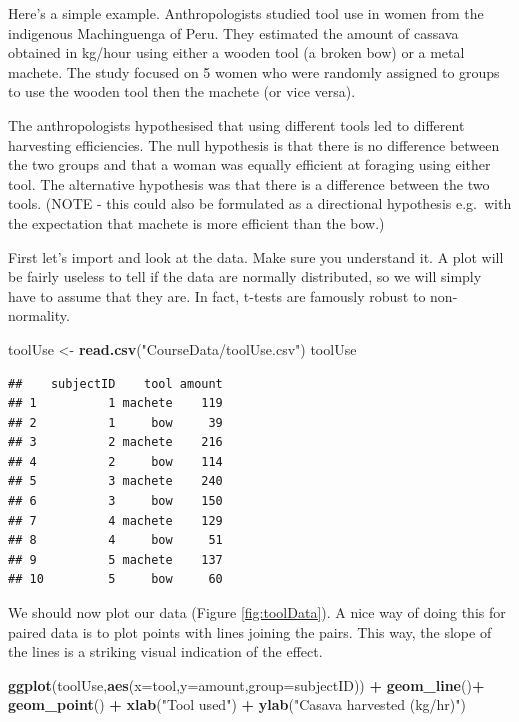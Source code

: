 \documentclass[
  a4paperpaper,
]{book}
\newenvironment{Shaded}{\begin{snugshade}}{\end{snugshade}}
\newcommand{\DataTypeTok}[1]{\textcolor[rgb]{0.13,0.29,0.53}{#1}}
\newcommand{\KeywordTok}[1]{\textcolor[rgb]{0.13,0.29,0.53}{\textbf{#1}}}
\newcommand{\NormalTok}[1]{#1}
\newcommand{\OperatorTok}[1]{\textcolor[rgb]{0.81,0.36,0.00}{\textbf{#1}}}
\newcommand{\StringTok}[1]{\textcolor[rgb]{0.31,0.60,0.02}{#1}}
\begin{document}
Here's a simple example. Anthropologists studied tool use in women from the indigenous Machinguenga of Peru. They estimated the amount of cassava obtained in kg/hour using either a wooden tool (a broken bow) or a metal machete. The study focused on 5 women who were randomly assigned to groups to use the wooden tool then the machete (or vice versa).

The anthropologists hypothesised that using different tools led to different harvesting efficiencies. The null hypothesis is that there is no difference between the two groups and that a woman was equally efficient at foraging using either tool. The alternative hypothesis was that there is a difference between the two tools. (NOTE - this could also be formulated as a directional hypothesis e.g.~with the expectation that machete is more efficient than the bow.)

First let's import and look at the data. Make sure you understand it. A plot will be fairly useless to tell if the data are normally distributed, so we will simply have to assume that they are. In fact, t-tests are famously robust to non-normality.

\begin{Shaded}
\begin{Highlighting}[]
\NormalTok{toolUse \textless{}{-}}\StringTok{ }\KeywordTok{read.csv}\NormalTok{(}\StringTok{"CourseData/toolUse.csv"}\NormalTok{)}
\NormalTok{toolUse}
\end{Highlighting}
\end{Shaded}

\begin{verbatim}
##    subjectID    tool amount
## 1          1 machete    119
## 2          1     bow     39
## 3          2 machete    216
## 4          2     bow    114
## 5          3 machete    240
## 6          3     bow    150
## 7          4 machete    129
## 8          4     bow     51
## 9          5 machete    137
## 10         5     bow     60
\end{verbatim}

We should now plot our data (Figure \ref{fig:toolData}). A nice way of doing this for paired data is to plot points with lines joining the pairs. This way, the slope of the lines is a striking visual indication of the effect.

\begin{Shaded}
\begin{Highlighting}[]
\KeywordTok{ggplot}\NormalTok{(toolUse,}\KeywordTok{aes}\NormalTok{(}\DataTypeTok{x=}\NormalTok{tool,}\DataTypeTok{y=}\NormalTok{amount,}\DataTypeTok{group=}\NormalTok{subjectID)) }\OperatorTok{+}\StringTok{ }
\StringTok{  }\KeywordTok{geom\_line}\NormalTok{()}\OperatorTok{+}
\StringTok{  }\KeywordTok{geom\_point}\NormalTok{() }\OperatorTok{+}
\StringTok{  }\KeywordTok{xlab}\NormalTok{(}\StringTok{"Tool used"}\NormalTok{) }\OperatorTok{+}
\StringTok{  }\KeywordTok{ylab}\NormalTok{(}\StringTok{"Casava harvested (kg/hr)"}\NormalTok{)}
\end{Highlighting}
\end{Shaded}
\end{document}
